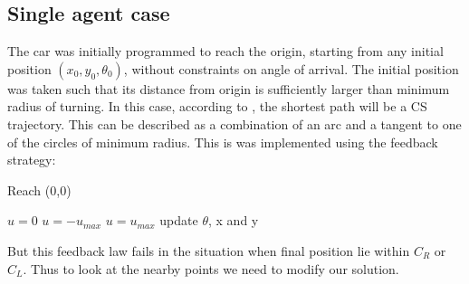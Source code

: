 \documentclass[11pt]{article} %
\begin{document}
\subsection{Single agent case}
The car was initially programmed to reach the origin, starting from any initial position $(x_0,y_0,\theta_0)$, without constraints on angle of arrival. The initial position was taken such that its distance from origin is sufficiently larger than minimum radius of turning. In this case, according to \cite{cockayne}, the shortest path will be a CS trajectory. This can be described as a combination of an arc and a tangent to one of the circles of minimum radius. This is was implemented using the feedback strategy: \\
\begin{algorithm}[H]
\caption{Reach (0,0)}
\begin{algorithmic} 
\STATE $u = 0$
\STATE $u = -u_{max}$
\ELSE
\STATE $u = u_{max}$
\ENDIF
\STATE update $\theta$, x and y
\ENDWHILE
\end{algorithmic}
\end{algorithm}
But this feedback law fails in the situation when final position lie within $C_R$ or $C_L$. Thus to look at the nearby points we need to modify our solution.
\end{document}
